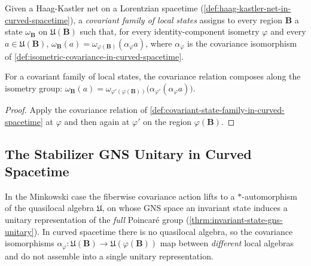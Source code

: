 \begin{definition}
    \label{def:covariant-state-family-in-curved-spacetime}
    \leanok
    Given a Haag-Kastler net on a Lorentzian spacetime (\ref{def:haag-kastler-net-in-curved-spacetime}), a \emph{covariant family of local states} assigns to every region $\mathbf{B}$ a state $\omega_{\mathbf{B}}$ on $\mathfrak{U}(\mathbf{B})$ such that, for every identity-component isometry $\varphi$ and every $a \in \mathfrak{U}(\mathbf{B})$, $\omega_{\mathbf{B}}(a) = \omega_{\varphi(\mathbf{B})}(\alpha_\varphi a)$, where $\alpha_\varphi$ is the covariance isomorphism of \ref{def:isometric-covariance-in-curved-spacetime}.
\end{definition}

\begin{lemma}
    \label{lmm:covariant-state-family-compose-in-curved-spacetime}
    \leanok
    For a covariant family of local states, the covariance relation composes along the isometry group: $\omega_{\mathbf{B}}(a) = \omega_{\varphi'(\varphi(\mathbf{B}))}\big(\alpha_{\varphi'}(\alpha_\varphi a)\big)$.
\end{lemma}
\begin{proof}
    \leanok
    Apply the covariance relation of \ref{def:covariant-state-family-in-curved-spacetime} at $\varphi$ and then again at $\varphi'$ on the region $\varphi(\mathbf{B})$.
\end{proof}

\subsection{The Stabilizer GNS Unitary in Curved Spacetime}

In the Minkowski case the fiberwise covariance action lifts to a $*$-automorphism of the quasilocal algebra $\mathfrak{U}$, on whose GNS space an invariant state induces a unitary representation of the \emph{full} Poincar\'e group (\ref{thrm:invariant-state-gns-unitary}). In curved spacetime there is no quasilocal algebra, so the covariance isomorphisms $\alpha_\varphi : \mathfrak{U}(\mathbf{B}) \to \mathfrak{U}(\varphi(\mathbf{B}))$ map between \emph{different} local algebras and do not assemble into a single unitary representation.

